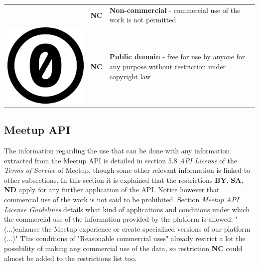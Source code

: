 \begin{table}[]
\begin{tabular}{p{1cm} p{1cm} p{10cm}}
\begin{minipage}{.1\textwidth}
    \end{minipage} & \textbf{NC} & \textbf{Non-commercial} - commercial use of the work is not permitted                                                                                               
    \\
 \begin{minipage}{.1\textwidth}
      \includegraphics[scale=.07]{images/cc_0.png}
    \end{minipage} & \textbf{NC} & \textbf{Public domain} - free for use by anyone for any purpose without restriction under copyright law \\
   \hline
\end{tabular}
\end{table}

\subsection{Meetup API}

The information regarding the use that can be done with any information extracted from the Meetup API is detailed in section 5.8 \textit{API License} of the \textit{Terms of Service} of Meetup, though some other relevant information is linked to other subsections. In this section it is explained that the restrictions \textbf{BY}, \textbf{SA}, \textbf{ND} apply for any further application of the API. Notice however that commercial use of the work is not said to be prohibited. Section \textit{Meetup API License Guidelines} details what kind of applications and conditions under which the commercial use of the information provided by the platform is allowed: "(...)enhance the Meetup experience or create specialized versions of our platform (...)" This conditions of "Reasonable commercial uses" already restrict a lot the possibility of making any commercial use of the data, so restriction \textbf{NC} could almost be added to the restrictions list too.

